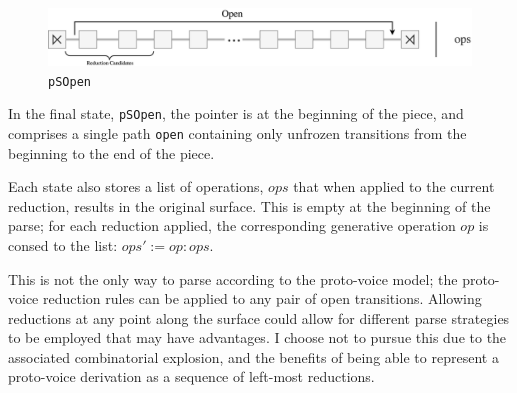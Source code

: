 \documentclass[12pt,a4paper,twoside,openany]{report} \usepackage[pdfborder={0 0 0}]{hyperref}    %
\theoremstyle{definition} \newtheorem{definition}{Definition}[section]
\begin{document}
      \begin{figure}[ht] \centering\includegraphics[width=\textwidth]{impl/parseState/open.png} \caption{\texttt{pSOpen}}
      \label{fig:pSOpen} \end{figure}

      In the final state, \texttt{pSOpen}, the pointer is at the beginning of the piece, and comprises a single path
      \texttt{open} containing only unfrozen transitions from the beginning to the end of the piece.

      Each state also stores a list of operations, $ops$ that when applied to the current reduction, results in the
      original surface. This is empty at the beginning of the parse; for each reduction applied, the corresponding
      generative operation $op$ is consed to the list: $ops' := op:ops$. 




      This is not the only way to parse according to the proto-voice model; the proto-voice reduction rules can be applied
      to any pair of open transitions. Allowing reductions at any point along the surface could allow for different
      parse strategies to be employed that may have advantages. I choose not to pursue this due to the associated
      combinatorial explosion, and the benefits of being able to represent a proto-voice derivation as a sequence of
      left-most reductions.
\end{document}
